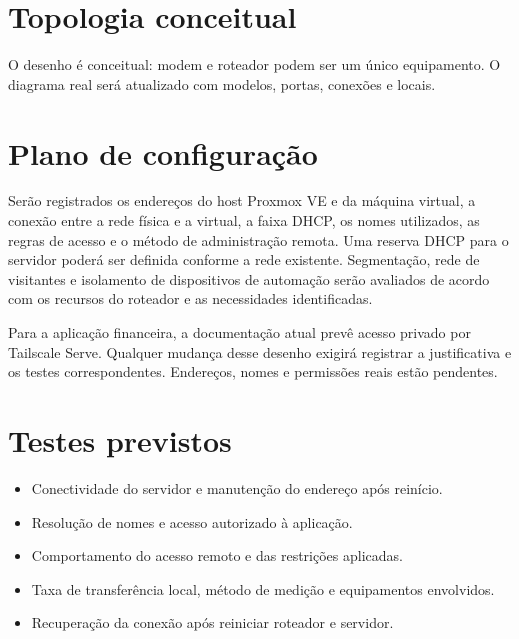 \documentclass[11pt,a4paper,oneside]{report}
\begin{document}
\section{Topologia conceitual}
\begin{center}
\end{center}
O desenho é conceitual: modem e roteador podem ser um único equipamento.
O diagrama real será atualizado com modelos, portas, conexões e locais.

\section{Plano de configuração}
Serão registrados os endereços do host Proxmox VE e da máquina virtual,
a conexão entre a rede física e a virtual, a faixa DHCP, os nomes utilizados,
as regras de acesso e o método de administração remota. Uma reserva DHCP para
o servidor poderá ser definida conforme a rede existente. Segmentação, rede
de visitantes e isolamento de dispositivos de automação serão avaliados de
acordo com os recursos do roteador e as necessidades identificadas.

Para a aplicação financeira, a documentação atual prevê acesso privado por
Tailscale Serve. Qualquer mudança desse desenho exigirá registrar a justificativa
e os testes correspondentes. Endereços, nomes e permissões reais estão pendentes.

\section{Testes previstos}
\begin{itemize}
\item Conectividade do servidor e manutenção do endereço após reinício.
\item Resolução de nomes e acesso autorizado à aplicação.
\item Comportamento do acesso remoto e das restrições aplicadas.
\item Taxa de transferência local, método de medição e equipamentos envolvidos.
\item Recuperação da conexão após reiniciar roteador e servidor.
\end{itemize}
\end{document}
